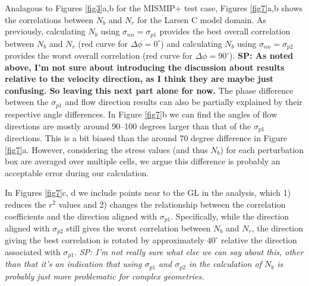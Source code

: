 \documentclass[review,oneside]{igs}
\begin{document}
Analagous to Figures \ref{fig3}a,b for the MISMIP+ test case, Figures \ref{fig7}a,b shows the correlations between $N_b$ and $N_r$ for the Larsen C model domain. As previously, calculating $N_b$ using $\sigma_{nn}=\sigma_{p1}$ provides the best overall correlation between $N_b$ and $N_r$ (red curve for $\Delta\phi=0^\circ$) and calculating $N_b$ using $\sigma_{nn}=\sigma_{p2}$ provides the worst overall correlation (red curve for $\Delta\phi=90^\circ$). \textbf{SP: As noted above, I'm not sure about introducing the discussion about results relative to the velocity direction, as I think they are maybe just confusing. So leaving this next part alone for now.} The phase difference between the $\sigma_{p1}$ and flow direction results can also be partially explained by their respective angle differences. In Figure \ref{fig7}b we can find the angles of flow directions are mostly around 90--100 degrees larger than that of the $\sigma_{p1}$ directions. This is a bit biased than the around 70 degree difference in Figure \ref{fig7}a. However, considering the stress values (and thus $N_b$) for each perturbation box are averaged over multiple cells, we argue this difference is probably an acceptable error during our calculation.  

In Figures \ref{fig7}c, d we include points near to the GL in the analysis, which 1) reduces the $r^2$ values and 2) changes the relationship between the correlation coefficients and the direction aligned with $\sigma_{p1}$. Specifically, while the direction aligned with $\sigma_{p2}$ still gives the worst correlation between $N_b$ and $N_r$, the direction giving the best correlation is rotated by approximately $40^\circ$ relative the direction associated with $\sigma_{p1}$. \textit{SP: I'm not really sure what else we can say about this, other than that it's an indication that using $\sigma_{p1}$ and $\sigma_{p2}$ in the calculation of $N_b$ is probably just more problematic for complex geometries.} 
\end{document}
